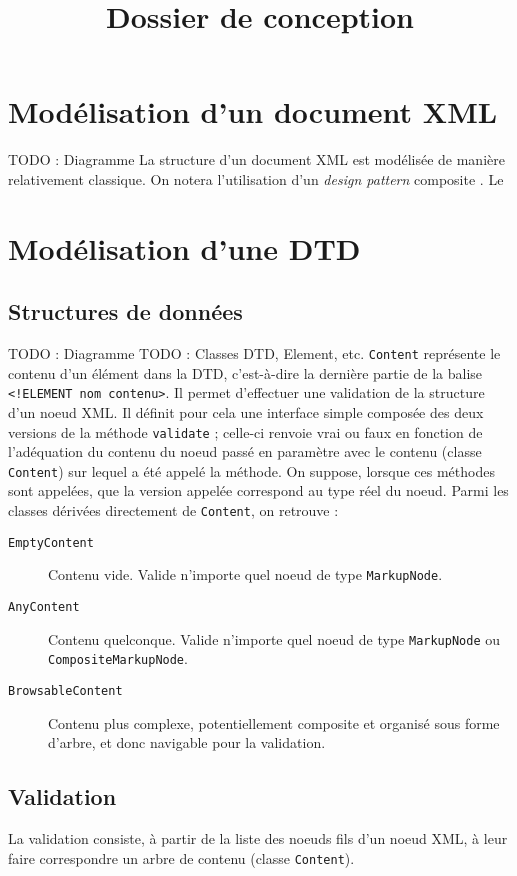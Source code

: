 \documentclass[12pt]{article}
\title{Dossier de conception}
\date{}
\newcommand{\kw}[1]{\texttt{#1}}
\newcommand{\TODO}[1]{{\huge TODO : #1}}
\begin{document}
\maketitle
\tableofcontents
\newpage
\section{Modélisation d'un document XML}
\TODO{Diagramme}
La structure d'un document XML est modélisée de manière relativement classique. On notera l'utilisation d'un \emph{design pattern} \og composite \fg.
Le

\section{Modélisation d'une DTD}
\subsection{Structures de données}
\TODO{Diagramme}
\TODO{Classes DTD, Element, etc.}
\kw{Content} représente le contenu d'un élément dans la DTD, c'est-à-dire la dernière partie de la balise \kw{<!ELEMENT nom contenu>}. Il permet d'effectuer une validation de la structure d'un noeud XML. Il définit pour cela une interface simple composée des deux versions de la méthode \kw{validate} ; celle-ci renvoie vrai ou faux en fonction de l'adéquation du contenu du noeud passé en paramètre avec le contenu (classe \kw{Content}) sur lequel a été appelé la méthode. On suppose, lorsque ces méthodes sont appelées, que la version appelée correspond au type réel du noeud.
Parmi les classes dérivées directement de \kw{Content}, on retrouve :
\begin{description}
\item[\kw{EmptyContent}] Contenu vide. Valide n'importe quel noeud de type \kw{MarkupNode}.
\item[\kw{AnyContent}] Contenu quelconque. Valide n'importe quel noeud de type \kw{MarkupNode} ou \kw{CompositeMarkupNode}.
\item[\kw{BrowsableContent}] Contenu plus complexe, potentiellement composite et organisé sous forme d'arbre, et donc navigable pour la validation.
\end{description}
\subsection{Validation}
La validation consiste, à partir de la liste des noeuds fils d'un noeud XML, à leur faire correspondre un arbre de contenu (classe \kw{Content}).
\end{document}
